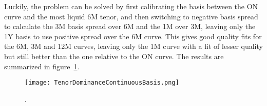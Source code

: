 \documentclass{article}
\begin{document}
Luckily, the problem can be solved by first calibrating the basis between the ON curve and the most liquid 6M tenor, and then switching to negative basis spread to calculate the 3M basis spread over 6M and the 1M over 3M, leaving only the 1Y basis to use positive spread over the 6M curve.  This gives good quality fits for the 6M, 3M and 12M curves, leaving only the 1M curve with a fit of lesser quality but still better than the one relative to the ON curve.  The results are summarized in figure~\ref{TenorDominanceContinuousBasis}.

\begin{figure}[t]
\centering
\texttt{[image: TenorDominanceContinuousBasis.png]}
\caption{.}
\label{TenorDominanceContinuousBasis}
\end{figure}



{}
\end{document}
